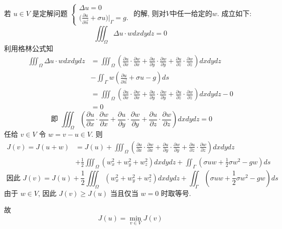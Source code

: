 \begin{questions}
\begin{solution}
若 $ u \in V $ 是定解问题 $ \left\{\begin{array}{l}\Delta u=0 \\ (\frac{\partial u}{\partial \vec{n}}+\left.\sigma u)\right|_{\Gamma}=g .\end{array}\right. $ 的解,
则对$V$中任一给定的$w$.
成立如下:
$$
\iiint_{\Omega} \Delta u \cdot w d x d y d z=0
$$
利用格林公式知
$$
\begin{aligned}
\iiint_{\Omega} \Delta u \cdot w d x d y d z & =\iiint_{\Omega}\left(\frac{\partial u}{\partial x} \cdot \frac{\partial w}{\partial x}+\frac{\partial u}{\partial y} \cdot \frac{\partial w}{\partial y}+\frac{\partial u}{\partial z} \cdot \frac{\partial w}{\partial z}\right) d x d y d z \\
& -\iint_{\Gamma} w\left(\frac{\partial u}{\partial \vec{n}}+\sigma u-g\right) ds \\
& =\iiint_{\Omega}\left(\frac{\partial u}{\partial x} \cdot \frac{\partial w}{\partial x}+\frac{\partial u}{\partial y} \cdot \frac{\partial w}{\partial y}+\frac{\partial u}{\partial z} \cdot \frac{\partial w}{\partial z}\right) d x d y d z-0 \\
& =0
\end{aligned}
$$
$$
\text { 即 } \iiint_{\Omega}\left(\frac{\partial u}{\partial x} \cdot \frac{\partial w}{\partial x}+\frac{\partial u}{\partial y} \cdot \frac{\partial w}{\partial y}+\frac{\partial u}{\partial z} \cdot \frac{\partial w}{\partial z}\right) d x d y d z=0
$$
任给 $ v\in V $ 令 $ w=v-u \in V $. 则
$$
\begin{aligned}
J(v)=J(u+w)&=J(u)+\iiint_{\Omega}\left(\frac{\partial u}{\partial x} \cdot \frac{\partial w}{\partial x}+\frac{\partial u}{\partial y} \cdot \frac{\partial w}{\partial y}+\frac{\partial u}{\partial z} \cdot \frac{\partial w}{\partial z}\right) d x d y d z \\
&+\frac{1}{2} \iiint_{\Omega}\left(w_{x}^{2}+w_{y}^{2}+w_{z}^{2}\right) d x d y d z+\iint_{\Gamma}\left(\sigma u w+\frac{1}{2} \sigma w^{2}-g w\right) d s
\end{aligned}
$$
$$
\text { 因此 } J(v)=J(u)+\frac{1}{2} \iiint_{\Omega}\left(w_{x}^{2}+w_{y}^{2}+w_{z}^{2}\right) d x d y d z+\iint_{\Gamma}\left(\sigma u w+\frac{1}{2} \sigma w^{2}-g w\right) ds
$$
由于 $ w \in V $, 因此 $ J(v) \geqslant J(u) $ 当且仅当 $ w=0 $ 时取等号.

故 $$ J(u)=\min _{v \in V} J(v) $$


\end{solution}
\end{questions}